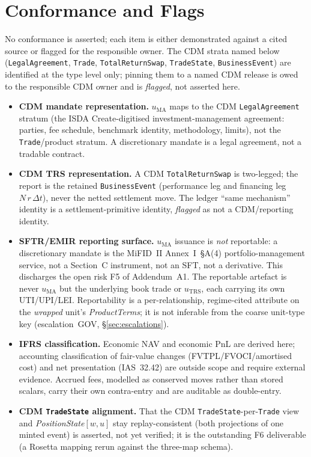 \documentclass[11pt,a4paper]{article}
\begin{document}
\section{Conformance and Flags}
\label{sec:conformance}

No conformance is asserted; each item is either demonstrated against a cited source or flagged for
the responsible owner. The CDM strata named below (\texttt{LegalAgreement}, \texttt{Trade},
\texttt{TotalReturnSwap}, \texttt{TradeState}, \texttt{BusinessEvent}) are identified at the type
level only; pinning them to a named CDM release is owed to the responsible CDM owner and is
\emph{flagged}, not asserted here.

\begin{itemize}[leftmargin=*]
\item \textbf{CDM mandate representation.} $u_{\mathrm{MA}}$ maps to the CDM
\texttt{LegalAgreement} stratum (the ISDA Create-digitised investment-management agreement:
parties, fee schedule, benchmark identity, methodology, limits), not the \texttt{Trade}/product
stratum. A discretionary mandate is a legal agreement, not a tradable contract.
\item \textbf{CDM TRS representation.} A CDM \texttt{TotalReturnSwap} is two-legged; the report is
the retained \texttt{BusinessEvent} (performance leg and financing leg
$N\,r\,\Delta t$), never the netted settlement move. The ledger ``same mechanism'' identity is a
settlement-primitive identity, \emph{flagged} as not a CDM/reporting identity.
\item \textbf{SFTR/EMIR reporting surface.} $u_{\mathrm{MA}}$ issuance is \emph{not} reportable: a
discretionary mandate is the MiFID~II Annex~I~\S A(4) portfolio-management service, not a Section~C
instrument, not an SFT, not a derivative. This discharges the open risk F5 of Addendum~A1. The
reportable artefact is never $u_{\mathrm{MA}}$ but the underlying book trade or $u_{\mathrm{TRS}}$,
each carrying its own UTI/UPI/LEI. Reportability is a per-relationship, regime-cited attribute on
the \emph{wrapped} unit's \textit{ProductTerms}; it is not inferable from the coarse unit-type key
(escalation~GOV, \S\ref{sec:escalations}).
\item \textbf{IFRS classification.} Economic NAV and economic PnL are derived here; accounting
classification of fair-value changes (FVTPL/FVOCI/amortised cost) and net presentation
(IAS~32.42) are outside scope and require external evidence. Accrued fees, modelled as conserved
moves rather than stored scalars, carry their own contra-entry and are auditable as double-entry.
\item \textbf{CDM \texttt{TradeState} alignment.} That the CDM \texttt{TradeState}-per-\texttt{Trade}
view and \textit{PositionState}$[w,u]$ stay replay-consistent (both projections of one minted
event) is asserted, not yet verified; it is the outstanding F6 deliverable (a Rosetta mapping
rerun against the three-map schema).
\end{itemize}
\end{document}

